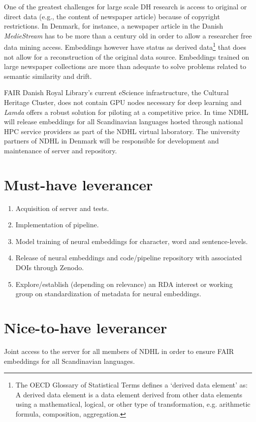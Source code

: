 \documentclass[12pt,a4paper]{article}
\begin{document}
One of the greatest challenges for large scale DH research is access to original or direct data (e.g., the content of newspaper article) because of copyright restrictions. In Denmark, for instance, a newspaper article in the Danish \textit{MedieStream} has to be more than a century old in order to allow a researcher free data mining access. Embeddings however have status as derived data\footnote{The OECD Glossary of Statistical Terms defines a `derived data element' as: A derived data element is a data element derived from other data elements using a mathematical, logical, or other type of transformation, e.g. arithmetic formula, composition, aggregation.} that does not allow for a reconstruction of the original data source. Embeddings trained on large newspaper collections are more than adequate to solve problems related to semantic similarity and drift.

FAIR Danish Royal Library's current eScience infrastructure, the Cultural Heritage Cluster, does not contain GPU nodes necessary for deep learning and \textit{Lamda} offers a robust solution for piloting at a competitive price. In time NDHL will release embeddings for all Scandinavian languages hosted through national HPC service providers as part of the NDHL virtual laboratory. The university partners of NDHL in Denmark will be responsible for development and maintenance of server and repository.

\section*{Must-have leverancer}
\begin{enumerate}
	\item Acquisition of server and tests.
	\item Implementation of pipeline.
	\item Model training of neural embeddings for character, word and sentence-levels.
	\item Release of neural embeddings and code/pipeline repository with associated DOIs through Zenodo.
	\item Explore/establish (depending on relevance) an RDA interest or working group on standardization of metadata for neural embeddings.
\end{enumerate}
\section*{Nice-to-have leverancer}
Joint access to the server for all members of NDHL in order to ensure FAIR embeddings for all Scandinavian languages.
\end{document}
